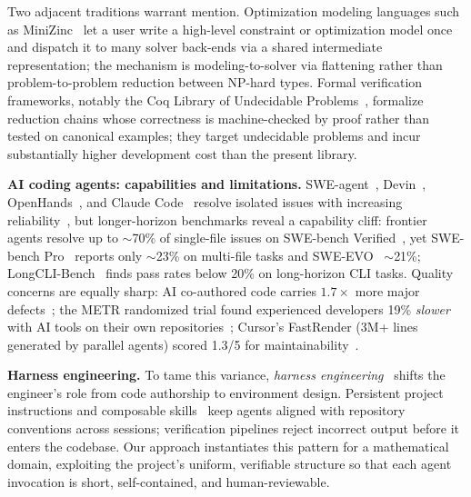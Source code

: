 \documentclass{article}
\begin{document}
Two adjacent traditions warrant mention. Optimization modeling languages such as MiniZinc~\cite{Nethercote2007MiniZinc} let a user write a high-level constraint or optimization model once and dispatch it to many solver back-ends via a shared intermediate representation; the mechanism is modeling-to-solver via flattening rather than problem-to-problem reduction between NP-hard types. Formal verification frameworks, notably the Coq Library of Undecidable Problems~\cite{Forster2020CoqLibrary}, formalize reduction chains whose correctness is machine-checked by proof rather than tested on canonical examples; they target undecidable problems and incur substantially higher development cost than the present library.

\textbf{AI coding agents: capabilities and limitations.}
SWE-agent~\cite{Yang2024SWEagent}, Devin~\cite{Wu2024Devin}, OpenHands~\cite{Wang2024OpenHands}, and Claude Code~\cite{Anthropic2025ClaudeCode} resolve isolated issues with increasing reliability~\cite{Xia2025LiveSWEagent}, but longer-horizon benchmarks reveal a capability cliff: frontier agents resolve up to $\sim$70\% of single-file issues on SWE-bench Verified~\cite{jimenez2024swebench}, yet SWE-bench Pro~\cite{Deng2025SWEBenchPro} reports only $\sim$23\% on multi-file tasks and SWE-EVO~\cite{Thai2025SWEEVO} $\sim$21\%; LongCLI-Bench~\cite{LongCLIBench2026} finds pass rates below 20\% on long-horizon CLI tasks.
Quality concerns are equally sharp: AI co-authored code carries $1.7{\times}$ more major defects~\cite{CodeRabbit2025AICodeQuality}; the METR randomized trial found experienced developers 19\% \emph{slower} with AI tools on their own repositories~\cite{Becker2025METRProductivityRCT}; Cursor's FastRender (3M+ lines generated by parallel agents) scored 1.3/5 for maintainability~\cite{CursorFastRender2026,SIGFastRender2026}.

\textbf{Harness engineering.}
To tame this variance, \emph{harness engineering}~\cite{OpenAI2026HarnessEngineering,Fowler2026HarnessEngineering} shifts the engineer's role from code authorship to environment design.
Persistent project instructions and composable skills~\cite{Claude2026AgentSkills, Obra2025Superpowers} keep agents aligned with repository conventions across sessions; verification pipelines reject incorrect output before it enters the codebase.
Our approach instantiates this pattern for a mathematical domain, exploiting the project's uniform, verifiable structure so that each agent invocation is short, self-contained, and human-reviewable.
\end{document}
